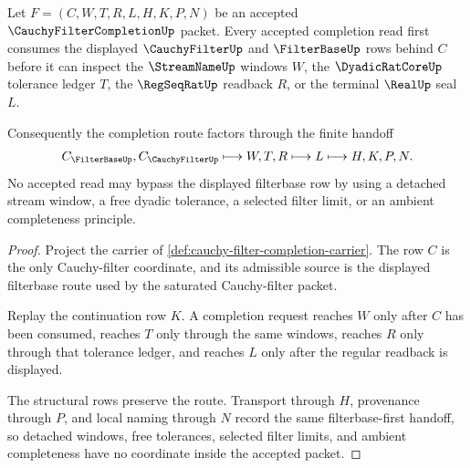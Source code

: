 \begin{theorem}
\label{thm:cauchy-filter-completion-filterbase-handoff}
Let $F=(C,W,T,R,L,H,K,P,N)$ be an accepted $\CauchyFilterCompletionUp$ packet. Every accepted completion read first consumes the displayed $\CauchyFilterUp$ and $\FilterBaseUp$ rows behind $C$ before it can inspect the $\StreamNameUp$ windows $W$, the $\DyadicRatCoreUp$ tolerance ledger $T$, the $\RegSeqRatUp$ readback $R$, or the terminal $\RealUp$ seal $L$.

Consequently the completion route factors through the finite handoff
$$
C_{\FilterBaseUp},C_{\CauchyFilterUp} \longmapsto W,T,R \longmapsto L \longmapsto H,K,P,N .
$$
No accepted read may bypass the displayed filterbase row by using a detached stream window, a free dyadic tolerance, a selected filter limit, or an ambient completeness principle.
\end{theorem}
\begin{proof}
Project the carrier of \autoref{def:cauchy-filter-completion-carrier}. The row $C$ is the only Cauchy-filter coordinate, and its admissible source is the displayed filterbase route used by the saturated Cauchy-filter packet.

Replay the continuation row $K$. A completion request reaches $W$ only after $C$ has been consumed, reaches $T$ only through the same windows, reaches $R$ only through that tolerance ledger, and reaches $L$ only after the regular readback is displayed.

The structural rows preserve the route. Transport through $H$, provenance through $P$, and local naming through $N$ record the same filterbase-first handoff, so detached windows, free tolerances, selected filter limits, and ambient completeness have no coordinate inside the accepted packet.
\end{proof}

